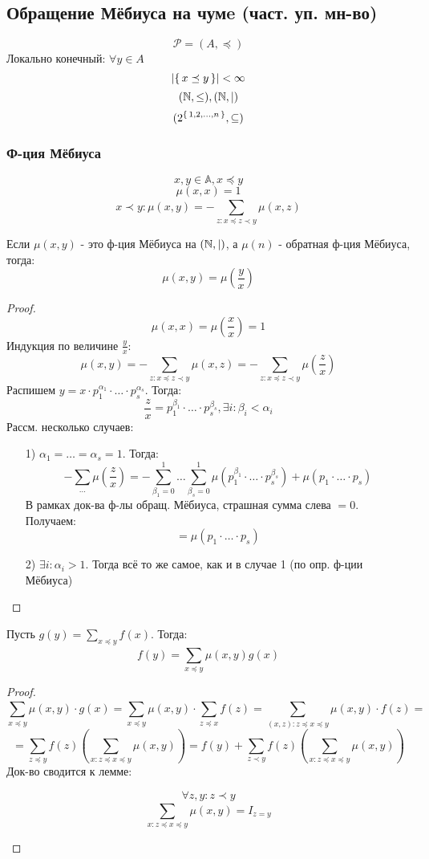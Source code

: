 \subsection{Обращение Мёбиуса на чумe (част. уп. мн-во)}
\[
  \mathscr{P} = (A, \preceq)
\]
Локально конечный: $\forall y \in A$
\[
\left|\set{ x \preceq y }\right| < \infty
\]
\[
  (\mathbb{N}, \leq), (\mathbb{N}, |)
\]
\[
  (2^{\set{1, 2, \ldots, n}}, \subseteq)
\]
\subsubsection{Ф-ция Мёбиуса}
\[
x, y \in \mathbb{A}, x \preceq y
\]
\[
\mu(x, x) = 1
\]
\[
x \prec y \colon \mu(x, y) = -\sum_{z \colon x \preceq z \prec y}^{} \mu(x, z)
\]
\begin{theorem}
Если $\mu(x, y)$ - это ф-ция Мёбиуса на $(\mathbb{N}, |)$, а $\mu(n)$ - обратная ф-ция Мёбиуса, тогда:
\[
\mu(x, y) = \mu\left(\frac{y}{x}\right)
\]
\end{theorem}
\begin{proof}
\[
\mu(x, x) = \mu\left(\frac{x}{x}\right) = 1
\]
Индукция по величине $\frac{y}{x}$: 
\[
\mu(x, y) = -\sum_{z \colon x \preceq z \prec y}^{} \mu(x, z) = -\sum_{z \colon x \preceq z \prec y}^{} \mu\left(\frac{z}{x}\right)
\]
Распишем $y = x \cdot p_1^{\alpha_1} \cdot \ldots \cdot p_s^{\alpha_s}$. Тогда:
\[
\frac{z}{x} = p_1^{\beta_1} \cdot \ldots \cdot p_s^{\beta_s}, \exists i \colon \beta_i < \alpha_i
\]
Рассм. несколько случаев:
\begin{itemize}
  \item [1) ] $\alpha_1 = \ldots = \alpha_s = 1$. Тогда:
\[
-\sum_{\ldots}^{} \mu\left(\frac{z}{x}\right) = -\sum_{\beta_1 = 0}^{1} \ldots \sum_{\beta_s = 0}^{1} \mu\left(p_1^{\beta_1}\cdot\ldots\cdot p_s^{\beta_s}\right) + \mu\left(p_1 \cdot \ldots \cdot p_s\right)
\]
В рамках док-ва ф-лы обращ. Мёбиуса, страшная сумма слева $= 0$. Получаем:
\[
 = \mu(p_1 \cdot \ldots \cdot p_s)
\]
  \item [2) ] $\exists i \colon \alpha_i > 1$. Тогда всё то же самое, как и в случае 1 (по опр. ф-ции Мёбиуса)
\end{itemize}
\end{proof}
\begin{theorem}
  Пусть $g(y) = \sum_{x \preceq y}^{} f(x)$. Тогда:
  \[
    f(y) = \sum_{x \preceq y}^{} \mu(x, y) g(x)
  \]
\end{theorem}
\begin{proof}
\[
\sum_{x \preceq y}^{} \mu(x, y) \cdot g(x) =\sum_{x \preceq y}^{} \mu(x, y) \cdot \sum_{z \preceq x}^{}  f(z) = \sum_{(x, z) \colon z \preceq x \preceq y}^{} \mu(x, y) \cdot f(z) = 
\]
\[
 = \sum_{z \preceq y}^{} f(z) \left(\sum_{x \colon z \preceq x \preceq y}^{} \mu(x, y)\right) = f(y) + \sum_{z \prec y}^{} f(z) \left(\sum_{x \colon z \preceq x \preceq y}^{} \mu(x, y)\right)
\]
Док-во сводится к лемме:
\begin{lemma}
\[
\forall z, y \colon z \prec y
\]
\[
\sum_{x \colon z \preceq x \preceq y}^{}\mu(x, y) = I_{z = y}
\]
\end{lemma}
\end{proof}

